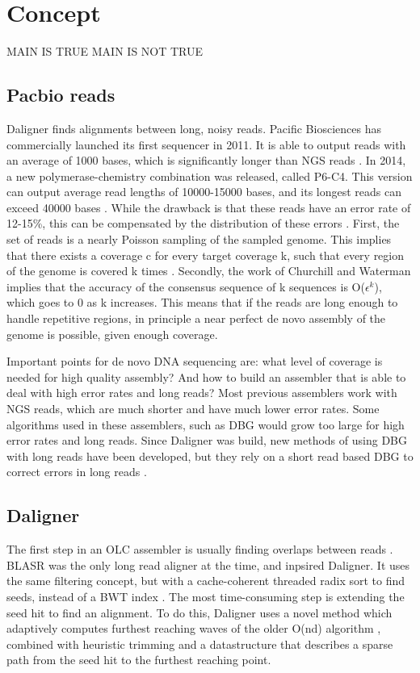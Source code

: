 \documentclass[../thesis.tex]{../ce}
\begin{document}
\chapter{Concept}
\ifdefined\main
\acresetall
MAIN IS TRUE
\else
MAIN IS NOT TRUE
\fi

\section{Pacbio reads}
Daligner finds alignments between long, noisy reads.
Pacific Biosciences has commercially launched its first sequencer in 2011.
It is able to output reads with an average of 1000 bases, which is significantly longer than \ac{NGS} reads  \cite{PBlaunch1}.
In 2014, a new polymerase-chemistry combination was released, called P6-C4.
This version can output average read lengths of 10000-15000 bases, and its longest reads can exceed 40000 bases \cite{Longreads}.
While the drawback is that these reads have an error rate of 12-15\%, this can be compensated by the distribution of these errors \cite{Daligner}.
First, the set of reads is a nearly Poisson sampling of the sampled genome.
This implies that there exists a coverage c for every target coverage k, such that every region of the genome is covered k times \cite{Poisson}.
Secondly, the work of Churchill and Waterman \cite{quality} implies that the accuracy of the consensus sequence of k sequences is O($\epsilon^k$), which goes to 0 as k increases.
This means that if the reads are long enough to handle repetitive regions, in principle a near perfect de novo assembly of the genome is possible, given enough coverage.

Important points for de novo DNA sequencing are: what level of coverage is needed for high quality assembly?
And how to build an assembler that is able to deal with high error rates and long reads?
Most previous assemblers work with \ac{NGS} reads, which are much shorter and have much lower error rates.
Some algorithms used in these assemblers, such as \ac{DBG} \cite{DeBruijn} would grow too large for high error rates and long reads.
Since Daligner was build, new methods of using \ac{DBG} with long reads have been developed, but they rely on a short read based \ac{DBG} to correct errors in long reads \cite{DBG1}\cite{DBG2}.

\section{Daligner}

The first step in an \ac{OLC} assembler is usually finding overlaps between reads \cite{OLC}.
BLASR \cite{BLASR} was the only long read aligner at the time, and inpsired Daligner.
It uses the same filtering concept, but with a cache-coherent threaded radix sort to find seeds, instead of a BWT index \cite{BWT}.
The most time-consuming step is extending the seed hit to find an alignment.
To do this, Daligner uses a novel method which adaptively computes furthest reaching waves of the older O(nd) algorithm \cite{O_ND}, combined with heuristic trimming and a datastructure that describes a sparse path from the seed hit to the furthest reaching point.
\end{document}
